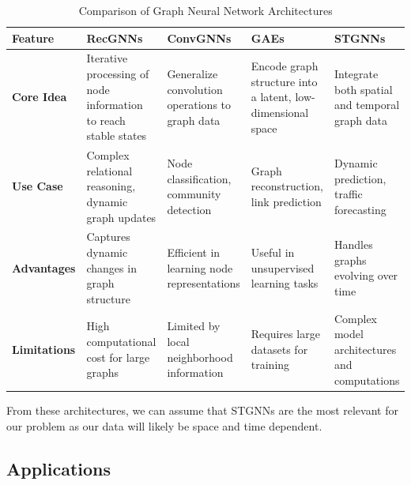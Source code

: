 \documentclass[conference]{IEEEtran}
\begin{document}
    \begin{table}[h]
        \centering
        \begin{tabularx}{\textwidth}{|X|X|X|X|X|}
            \hline
            \textbf{Feature}     & \textbf{RecGNNs}                                                & \textbf{ConvGNNs}                               & \textbf{GAEs}                                               & \textbf{STGNNs}                                \\ \hline
            \textbf{Core Idea}   & Iterative processing of node information to reach stable states      & Generalize convolution operations to graph data   & Encode graph structure into a latent, low-dimensional space   & Integrate both spatial and temporal graph data    \\ \hline
            \textbf{Use Case}    & Complex relational reasoning, dynamic graph updates             & Node classification, community detection          & Graph reconstruction, link prediction                         & Dynamic prediction, traffic forecasting           \\ \hline
            \textbf{Advantages}  & Captures dynamic changes in graph structure                     & Efficient in learning node representations        & Useful in unsupervised learning tasks                         & Handles graphs evolving over time                 \\ \hline
            \textbf{Limitations} & High computational cost for large graphs                        & Limited by local neighborhood information         & Requires large datasets for training                          & Complex model architectures and computations      \\ \hline
        \end{tabularx}
        \caption{Comparison of Graph Neural Network Architectures}
        \label{tab:gnn_comparison}
    \end{table}


    From these architectures, we can assume that STGNNs are the most relevant for our problem as our data will likely be space and time dependent.

    \subsection{Applications}\label{subsec:applications}
\end{document}
